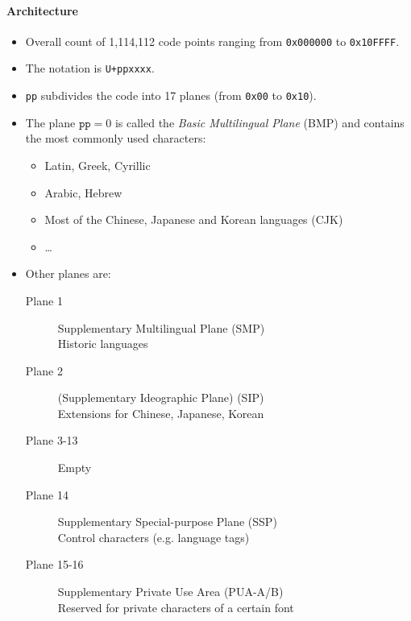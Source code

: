             	\paragraph{Architecture}
            		\begin{itemize}
            			\item Overall count of 1,114,112 code points ranging from \texttt{0x000000} to \texttt{0x10FFFF}.
            			\item The notation is \texttt{U+ppxxxx}.
            			\item \texttt{pp} subdivides the code into 17 planes (from \texttt{0x00} to \texttt{0x10}).
            			\item The plane \( \texttt{pp} = 0 \) is called the \textit{Basic Multilingual Plane} (BMP) and contains the most commonly used characters:
            				\begin{itemize}
            					\item Latin, Greek, Cyrillic
            					\item Arabic, Hebrew
            					\item Most of the Chinese, Japanese and Korean languages (CJK)
            					\item \dots
            				\end{itemize}
            			\item Other planes are:
            				\begin{description}
            					\item[Plane 1] Supplementary Multilingual Plane (SMP) \\ Historic languages
            					\item[Plane 2] (Supplementary Ideographic Plane) (SIP) \\ Extensions for Chinese, Japanese, Korean
            					\item[Plane 3-13] Empty
            					\item[Plane 14] Supplementary Special-purpose Plane (SSP) \\ Control characters (e.g. language tags)
            					\item[Plane 15-16] Supplementary Private Use Area (PUA-A/B) \\ Reserved for private characters of a certain font
            				\end{description}
            		\end{itemize}

